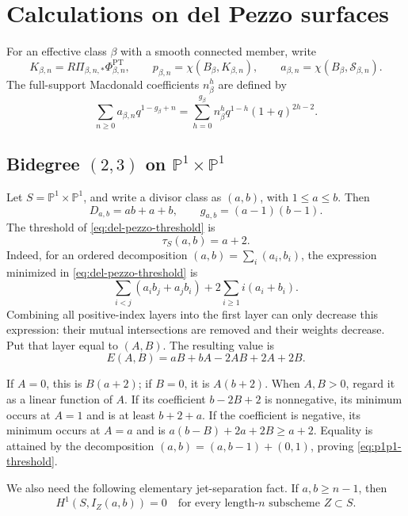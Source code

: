 \documentclass[11pt,reqno]{amsart}
\theoremstyle{definition}
\newcommand{\Pp}{\mathbb P}
\newcommand{\PT}{\operatorname{PT}}
\begin{document}
\section{Calculations on del Pezzo surfaces}
\label{sec:examples}

For an effective class $\beta$ with a smooth connected member, write
\[
 K_{\beta,n}=R\Pi_{\beta,n,*}\Phi_{\beta,n}^{\PT},\qquad
 p_{\beta,n}=\chi(B_\beta,K_{\beta,n}),\qquad
 a_{\beta,n}=\chi(B_\beta,\mathcal S_{\beta,n}).
\]
The full-support Macdonald coefficients $n_\beta^h$ are defined by
\begin{equation}\label{eq:del-pezzo-macdonald-basis}
 \sum_{n\ge0}a_{\beta,n}q^{1-g_\beta+n}
 =\sum_{h=0}^{g_\beta}n_\beta^h q^{1-h}(1+q)^{2h-2}.
\end{equation}

\subsection{\texorpdfstring{Bidegree $(2,3)$ on
$\Pp^1\times\Pp^1$}{Bidegree (2,3) on P1 x P1}}

Let \(S=\Pp^1\times\Pp^1\), and write a divisor class as \((a,b)\),
with \(1\le a\le b\).  Then
\[
 D_{a,b}=ab+a+b,\qquad g_{a,b}=(a-1)(b-1).
\]
The threshold of \eqref{eq:del-pezzo-threshold} is
\begin{equation}\label{eq:p1p1-threshold}
 \tau_S(a,b)=a+2.
\end{equation}
Indeed, for an ordered decomposition
\((a,b)=\sum_i(a_i,b_i)\), the expression minimized in
\eqref{eq:del-pezzo-threshold} is
\[
 \sum_{i<j}(a_i b_j+a_j b_i)
 +2\sum_{i\ge1}i(a_i+b_i).
\]
Combining all positive-index layers into the first layer can only decrease
this expression: their mutual intersections are removed and their weights
decrease.  Put that layer equal to \((A,B)\).  The resulting value is
\[
 E(A,B)=aB+bA-2AB+2A+2B.
\]

If \(A=0\), this is \(B(a+2)\); if \(B=0\), it is \(A(b+2)\).
When \(A,B>0\), regard it as a linear function of \(A\).  If its
coefficient \(b-2B+2\) is nonnegative, its minimum occurs at \(A=1\)
and is at least \(b+2+a\).  If the coefficient is negative, its minimum
occurs at \(A=a\) and is
\(a(b-B)+2a+2B\ge a+2\).  Equality is attained by the decomposition
\((a,b)=(a,b-1)+(0,1)\), proving \eqref{eq:p1p1-threshold}.

We also need the following elementary jet-separation fact.  If
\(a,b\ge n-1\), then
\begin{equation}\label{eq:p1p1-jet-separation}
 H^1(S,I_Z(a,b))=0
 \quad\text{for every length-$n$ subscheme }Z\subset S.
\end{equation}
\end{document}

